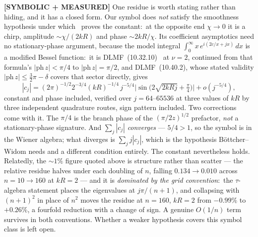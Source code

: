 \documentclass[aps,pra,twocolumn,superscriptaddress,longbibliography]{revtex4-2}
\begin{document}
\textbf{[SYMBOLIC + MEASURED]} One residue is worth stating rather than
hiding, and it has a closed form.  Our symbol does \emph{not} satisfy the
smoothness hypothesis under which~\cite{bottcher_widom2005} proves the
constant:\ at the opposite end $\chi\to0$ it is a chirp, amplitude
$\sim\chi/(2kR)$ and phase $\sim2kR/\chi$.  Its coefficient asymptotics need no
stationary-phase argument, because the model integral
$\int_0^\infty x\,e^{i(2c/x+jx)}\,dx$ is a modified Bessel function:\ it is
DLMF~(10.32.10)~\cite{dlmf} at $\nu=2$, continued from that formula's
$|\mathrm{ph}\,z|<\pi/4$ to $|\mathrm{ph}\,z|=\pi/2$, and DLMF~(10.40.2), whose
stated validity $|\mathrm{ph}\,z|\le\tfrac32\pi-\delta$ covers that sector
directly, gives
\begin{equation}
|c_j|=(2\pi)^{-1/2}2^{-3/4}(kR)^{-1/4}\,j^{-5/4}
\bigl|\sin\!\bigl(2\sqrt{2kRj}+\tfrac\pi4\bigr)\bigr|+o(j^{-5/4}),
\label{eq:chirp_decay}
\end{equation}
constant and phase included, verified over $j=64$--$65536$ at three values of
$kR$ by three independent quadrature routes, sign pattern included.  Two
corrections come with it.  The $\pi/4$ is the branch phase of the
$(\pi/2z)^{1/2}$ prefactor, \emph{not} a stationary-phase signature.  And
$\sum_j|c_j|$ \emph{converges} --- $5/4>1$, so the symbol is in the Wiener
algebra; what diverges is $\sum_jj|c_j|$, which is the hypothesis
B\"ottcher--Widom needs and a different condition entirely.  The constant
nevertheless holds.  Relatedly, the
$\sim\!1\%$ figure quoted above is structure rather than scatter --- the
relative residue halves under each doubling of $n$, falling
$0.134\to0.010$ across $n=10\to160$ at $kR=2$ --- and it is \emph{dominated by
the grid convention}:\ the $\tau$-algebra statement places the eigenvalues at
$j\pi/(n+1)$, and collapsing with $(n+1)^2$ in place of $n^2$ moves the residue
at $n=160$, $kR=2$ from $-0.99\%$ to $+0.26\%$, a fourfold reduction with a
change of sign.  A genuine $O(1/n)$ term survives in both conventions.  Whether a weaker
hypothesis covers this symbol class is left open.
\end{document}
